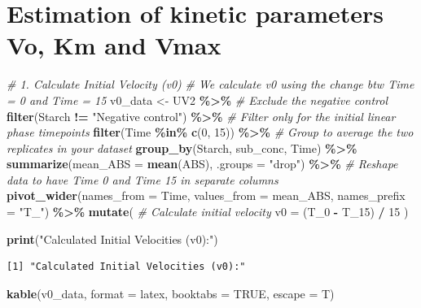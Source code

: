 \documentclass[
  12pt,
]{article}
\newenvironment{Shaded}{\begin{snugshade}}{\end{snugshade}}
\newcommand{\AttributeTok}[1]{\textcolor[rgb]{0.13,0.29,0.53}{#1}}
\newcommand{\CommentTok}[1]{\textcolor[rgb]{0.56,0.35,0.01}{\textit{#1}}}
\newcommand{\ConstantTok}[1]{\textcolor[rgb]{0.56,0.35,0.01}{#1}}
\newcommand{\DecValTok}[1]{\textcolor[rgb]{0.00,0.00,0.81}{#1}}
\newcommand{\FunctionTok}[1]{\textcolor[rgb]{0.13,0.29,0.53}{\textbf{#1}}}
\newcommand{\NormalTok}[1]{#1}
\newcommand{\OtherTok}[1]{\textcolor[rgb]{0.56,0.35,0.01}{#1}}
\newcommand{\SpecialCharTok}[1]{\textcolor[rgb]{0.81,0.36,0.00}{\textbf{#1}}}
\newcommand{\StringTok}[1]{\textcolor[rgb]{0.31,0.60,0.02}{#1}}
\begin{document}
\section{Estimation of kinetic parameters Vo, Km and
Vmax}\label{estimation-of-kinetic-parameters-vo-km-and-vmax}

\begin{Shaded}
\begin{Highlighting}[]
\CommentTok{\# 1. Calculate Initial Velocity (v0)}
\CommentTok{\# We calculate v0 using the change btw Time = 0 and Time = 15}
\NormalTok{v0\_data }\OtherTok{\textless{}{-}}\NormalTok{ UV2 }\SpecialCharTok{\%\textgreater{}\%}
  \CommentTok{\# Exclude the negative control }
  \FunctionTok{filter}\NormalTok{(Starch }\SpecialCharTok{!=} \StringTok{"Negative control"}\NormalTok{) }\SpecialCharTok{\%\textgreater{}\%}
  \CommentTok{\# Filter only for the initial linear phase timepoints}
  \FunctionTok{filter}\NormalTok{(Time }\SpecialCharTok{\%in\%} \FunctionTok{c}\NormalTok{(}\DecValTok{0}\NormalTok{, }\DecValTok{15}\NormalTok{)) }\SpecialCharTok{\%\textgreater{}\%}
  \CommentTok{\# Group to average the two replicates in your dataset}
  \FunctionTok{group\_by}\NormalTok{(Starch, sub\_conc, Time) }\SpecialCharTok{\%\textgreater{}\%}
  \FunctionTok{summarize}\NormalTok{(}\AttributeTok{mean\_ABS =} \FunctionTok{mean}\NormalTok{(ABS), }\AttributeTok{.groups =} \StringTok{"drop"}\NormalTok{) }\SpecialCharTok{\%\textgreater{}\%}
  \CommentTok{\# Reshape data to have Time 0 and Time 15 in separate columns}
  \FunctionTok{pivot\_wider}\NormalTok{(}\AttributeTok{names\_from =}\NormalTok{ Time, }\AttributeTok{values\_from =}\NormalTok{ mean\_ABS,}
              \AttributeTok{names\_prefix =} \StringTok{"T\_"}\NormalTok{) }\SpecialCharTok{\%\textgreater{}\%}
  \FunctionTok{mutate}\NormalTok{(}
    \CommentTok{\# Calculate initial velocity}
    \AttributeTok{v0 =}\NormalTok{ (T\_0 }\SpecialCharTok{{-}}\NormalTok{ T\_15) }\SpecialCharTok{/} \DecValTok{15}
\NormalTok{  )}

\FunctionTok{print}\NormalTok{(}\StringTok{"Calculated Initial Velocities (v0):"}\NormalTok{)}
\end{Highlighting}
\end{Shaded}

\begin{verbatim}
[1] "Calculated Initial Velocities (v0):"
\end{verbatim}

\begin{Shaded}
\begin{Highlighting}[]
\FunctionTok{kable}\NormalTok{(v0\_data, }\AttributeTok{format =} \StringTok{\textquotesingle{}latex\textquotesingle{}}\NormalTok{, }\AttributeTok{booktabs =} \ConstantTok{TRUE}\NormalTok{, }\AttributeTok{escape =}\NormalTok{ T)}
\end{Highlighting}
\end{Shaded}
\end{document}
